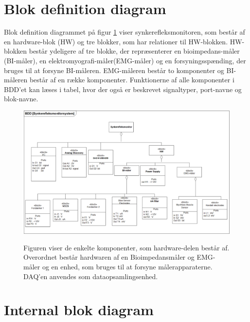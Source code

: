 \section{Blok definition diagram}

Blok definition diagrammet på figur \ref{figbdd} viser synkerefleksmonitoren, som består af en hardware-blok (HW) og tre blokker, som har relationer til HW-blokken. HW-blokken består ydeligere af tre blokke, der repræsenterer en bioimpedans-måler (BI-måler), en elektromyografi-måler(EMG-måler) og en forsyningsspænding, der bruges til at forsyne BI-måleren.  EMG-måleren består to komponenter og BI-måleren består af en række komponenter. Funktionerne af alle komponenter i BDD'et kan læses i tabel, hvor der også er beskrevet signaltyper, port-navne og blok-navne.  

\begin{figure}[H] 
\centering
{\includegraphics[width=\linewidth]
{Figure/BDD}}
\caption{Figuren viser de enkelte komponenter, som hardware-delen består af. Overordnet består hardwaren af en Bioimpedansmåler og EMG-måler og en enhed, som bruges til at forsyne  målerapparaterne. DAQ'en anvendes som dataopsamlingsenhed.}
\label{figbdd}
\end{figure}

\section{Internal blok diagram}

